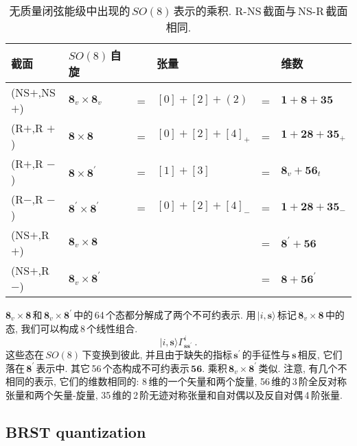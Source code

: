 \begin{table}[ht]
\caption{无质量闭弦能级中出现的$\,SO(8)\,$表示的乘积. R-NS\,截面与\,NS-R\,截面相同.}
\label{tab:10.3}%
\centering
\begin{tabular}[c]{llclcl}
\hline\hline
 \vphantom{\Big(}截面  & $SO(8)\,$自旋  & & 张量 & & 维数 \\
\hline
 (NS$+$,NS$+$)& $\mathbf{8}_{v} \times \mathbf{8}_{v}$ & = & $[0]+[2]+(2)$ & = & $\mathbf{1}+\mathbf{8}+\mathbf{35} $\\
 (R$+$,R $+$) & $\mathbf{8} \times \mathbf{8}$ & = & $[0]+[2]+[4]_{+}$ & = & $\mathbf{1}+\mathbf{28}+\mathbf{35}_{+} $ \\
 (R$+$,R $-$)& $\mathbf{8}\times \mathbf{8}^{\prime}$ & = & $[1]+[3]$ & = & $\mathbf{8}_{v}+\mathbf{56}_{t} $ \\
 (R$-$,R $-$)& $\mathbf{8}^{\prime} \times \mathbf{8}^{\prime}$ & = & $[0]+[2]+[4]_{-}$ & = & $\mathbf{1}+\mathbf{28}+\mathbf{35}_{-} $ \\
 (NS$+$,R$+$)& $\mathbf{8}_{v} \times \mathbf{8}$ &  & & = & $ \mathbf{8}^{\prime}+\mathbf{56} $\\
 (NS$+$,R$-$)& $\mathbf{8}_{v} \times \mathbf{8}^{\prime}$ &  & & = & $ \mathbf{8}+\mathbf{56}^{\prime} $ \\
 \hline\hline
\end{tabular}
\end{table}

$\mathbf{8}_{v} \times \mathbf{8}\,$和\,$\mathbf{8}_{v} \times \mathbf{8}^{\prime}$\,中的\,64\,个态都分解成了两个不可约表示. 用$\,\lvert i,\mathbf{s}\rangle\,$标记$\,\mathbf{8}_{v} \times \mathbf{8}\,$中的态, 我们可以构成\,8\,个线性组合.
\begin{equation}
    \lvert i,\mathbf{s}\rangle \Gamma_{\mathbf{s}\mathbf{s}^{\prime}}^{i} \: . \label{10.5.19}
\end{equation}
这些态在$\,SO(8)\,$下变换到彼此, 并且由于缺失的指标$\,\mathbf{s}^{\prime}\,$的手征性与$\,\mathbf{s}\,$相反, 它们落在$\,\mathbf{8}^{\prime}\,$表示中. 其它\,56\,个态构成不可约表示$\,\mathbf{56}$. 乘积$\,\mathbf{8}_{v} \times \mathbf{8}^{\prime}\,$类似. 注意, 有几个不相同的表示, 它们的维数相同的: 8\,维的一个矢量和两个旋量, 56\,维的\,3\,阶全反对称张量和两个矢量-旋量, 35\,维的\,2\,阶无迹对称张量和自对偶以及反自对偶\,4\,阶张量.


\subsection*{BRST quantization}


